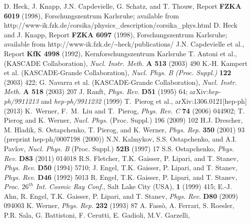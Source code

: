  D. Heck, J. Knapp, J.N. Capdevielle, G. Schatz, and
              T. Thouw, Report {\bf FZKA 6019} (1998), Forschungszentrum 
              Karls\-ruhe; available from\\
         http://www-ik.fzk.de/corsika/physics\_description/corsika\_phys.html
 D. Heck and J. Knapp, Report {\bf FZKA 6097} (1998), 
              Forschungszentrum Karls\-ruhe; available from
              http://www-ik.fzk.de/\~{}heck/publications/
J.N. Capdevielle et al., Report {\bf KfK 4998} (1992),
              Kernforschungszentrum Karls\-ruhe
 T. Antoni et al., (KASCADE Collaboration),
              {\it Nucl. Instr. Meth.} {\bf A 513} (2003) 490
 K.-H. Kampert et al. (KASCADE-Grande Collaboration), 
              {\it Nucl.  Phys. B (Proc. Suppl.)} {\bf 122} (2003) 422;
              G. Navarra et al. (KASCADE-Grande Collaboration),
              {\it Nucl. Instr. Meth.} {\bf A 518} (2003) 207
 J. Ranft, {\it Phys. Rev.} {\bf D51} (1995) 64;
              arXiv:{\it hep-ph/9911213} and {\it hep-ph/9911232} (1999)
 T.~Pierog et al., arXiv:1306.0121[hep-ph] (2013)
 K.~Werner, F.~M.~Liu and T.~Pierog,
               {\it Phys. Rev. C} {\bf 74} (2006) 044902;
                T. Pierog and K. Werner, {\it Nucl. Phys.} (Proc. Suppl.) 
               196 (2009) 102
 H.J. Drescher, M. Hladik, S. Ostapchenko, T. Pierog, and
              K. Werner, {\it Phys. Rep.} {\bf 350} (2001) 93 
              (preprint hep-ph/0007198 (2000))
 N.N. Kalmykov, S.S. Ostapchenko, and A.I. Pavlov, {\it Nucl. 
              Phys. B} (Proc. Suppl.) {\bf 52B} (1997) 17
 S.S. Ostapchenko, {\it Phys. Rev.} {\bf D83}
              (2011) 014018
R.S. Fletcher, T.K. Gaisser, P. Lipari, and T. Stanev,
              {\it Phys. Rev.} {\bf D50} (1994) 5710;
              J. Engel, T.K. Gaisser, P. Lipari, and T. Stanev,
              {\it Phys. Rev.} {\bf D46} (1992) 5013
R. Engel, T.K. Gaisser, P. Lipari, and T. Stanev,
              {\it Proc. $26^{th}$ Int. Cosmic Ray Conf.}, Salt Lake
              City (USA), {\bf 1} (1999) 415; 
              E.-J. Ahn, R. Engel, T.K. Gaisser, P. Lipari, and T. Stanev, 
              {\it Phys. Rev.} {\bf D80} (2009) 094003
 K. Werner, {\it Phys. Rep.} {\bf 232} (1993) 87
 A. Fass\`o, A. Ferrari, S. Roesler, P.R. Sala,
              G. Battistoni, F. Cerutti, E. Gadioli, M.V. Garzelli,
